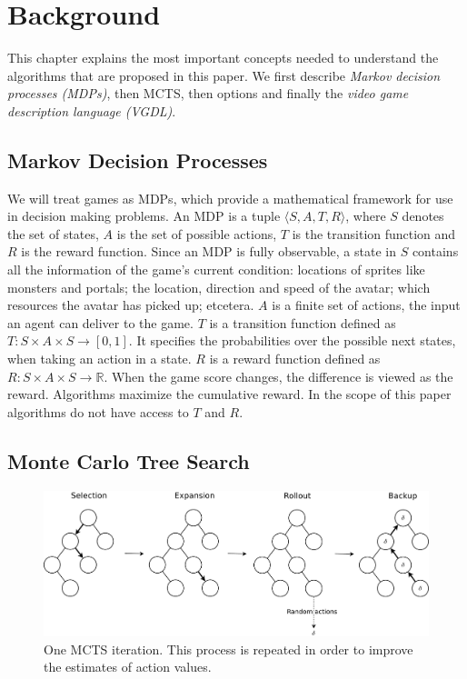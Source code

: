 \section{Background}
\label{sec:background}

This chapter explains the most important concepts needed to understand the
algorithms that are proposed in this paper. We first describe \emph{Markov
decision processes (MDPs)}, then  MCTS, then options and finally the \emph{video
game description language (VGDL)}.

\subsection{Markov Decision Processes}
\label{subsec:mdps}
We will treat games as MDPs, which provide a mathematical framework for use in
decision making problems. An MDP is a tuple $\langle S, A, T, R \rangle$, where
$S$ denotes the set of states, $A$ is the set of possible actions, $T$ is the
transition function and $R$ is the reward function. Since an MDP is fully
observable, a state in $S$ contains all the information of the game's current
condition: locations of sprites like monsters and portals; the location,
direction and speed of the avatar; which resources the avatar has picked up;
etcetera. $A$ is a finite set of actions, the input an agent can deliver to the
game. $T$ is a transition function defined as $T : S \times A \times S
\rightarrow \left[0,1\right]$. It specifies the probabilities over the possible
next states, when taking an action in a state.  $R$ is a reward function defined
as $R: S \times A \times S \rightarrow \mathbb{R}$. When the game score changes,
the difference is viewed as the reward.  Algorithms maximize the cumulative
reward. In the scope of this paper algorithms do not have access to $T$ and $R$.

\subsection{Monte Carlo Tree Search}
\begin{figure}
	\centering
	\includegraphics[width=\columnwidth]{includes/mcts-wide-eps-converted-to}
	\caption{One MCTS iteration. This process is repeated in order to improve
	the estimates of action values.}
\label{fig:mcts}
\end{figure}


